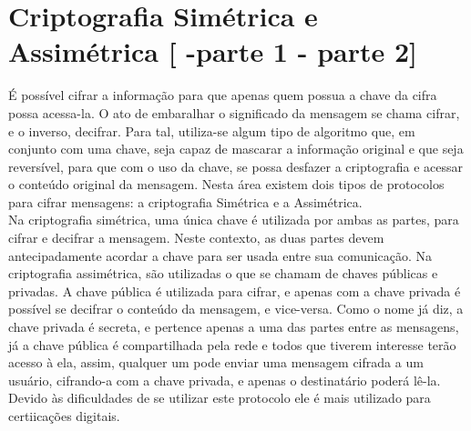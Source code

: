 \documentclass{article}
\begin{document}
	\section{Criptografia Simétrica e Assimétrica [\cite{STALLINS} -parte 1 - parte 2]}
		\begin{flushleft}
			

 			\hspace{2cm} É possível cifrar a informação para que apenas quem possua a chave da cifra possa acessa-la. O ato de embaralhar o significado da mensagem se chama cifrar, e o inverso, decifrar. Para tal, utiliza-se algum tipo de algoritmo que, em conjunto com uma chave, seja capaz de mascarar a informação original e que seja reversível, para que com o uso da chave, se possa desfazer a criptografia e acessar o conteúdo original da mensagem. Nesta área existem dois tipos de protocolos para cifrar mensagens: a criptografia Simétrica e a Assimétrica. \\
			\hspace{2cm}Na criptografia simétrica, uma única chave é utilizada por ambas as partes, para cifrar e decifrar a mensagem. Neste contexto, as duas partes devem antecipadamente acordar a chave para ser usada entre sua comunicação. Na criptografia assimétrica, são utilizadas o que se chamam de chaves públicas e privadas. A chave pública é utilizada para cifrar, e apenas com a chave privada é possível se decifrar o conteúdo da mensagem, e vice-versa. Como o nome já diz, a chave privada é secreta, e pertence apenas a uma das partes entre as mensagens, já a chave pública é compartilhada pela rede e todos que tiverem interesse terão acesso à ela, assim, qualquer um pode enviar uma mensagem cifrada a um usuário, cifrando-a com a chave privada, e apenas o destinatário poderá lê-la. Devido às dificuldades de se utilizar este protocolo ele é mais utilizado para certiicações digitais.
					
		\end{flushleft}
\end{document}
